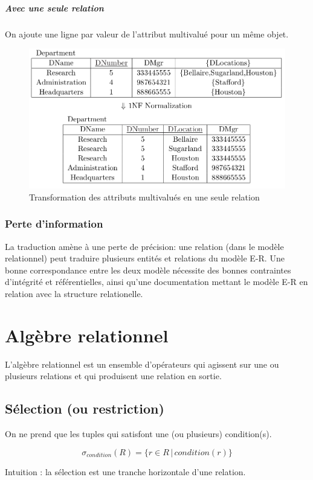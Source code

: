 \documentclass[a4paper]{article}
\begin{document}
\subparagraph{Avec une seule relation}
On ajoute une ligne par valeur de l'attribut multivalué pour un même objet.
\begin{figure}[H]
    \center
    \includegraphics[width=.7\textwidth]{fig/multiattrs-single.png}
    \caption{Transformation des attributs multivalués en une seule relation}
\end{figure}

\subsubsection{Perte d'information}
La traduction amène à une perte de précision: une relation (dans le modèle relationnel)
peut traduire plusieurs entités et relations du modèle E-R. Une bonne correspondance
entre les deux modèle nécessite des bonnes contraintes d'intégrité et référentielles,
ainsi qu'une documentation mettant le modèle E-R en relation avec la structure relationelle.



\section{Algèbre relationnel}

L'algèbre relationnel est un ensemble d'opérateurs qui agissent sur une ou plusieurs
relations et qui produisent une relation en sortie.

  \subsection{Sélection (ou restriction)}
  On ne prend que les tuples qui satisfont une (ou plusieurs) condition(s).

    $$ \sigma_{condition}(R) = \{r\in R\, |\, condition(r)\} $$

  Intuition : la sélection est une tranche horizontale d'une relation.
  
\end{document}
